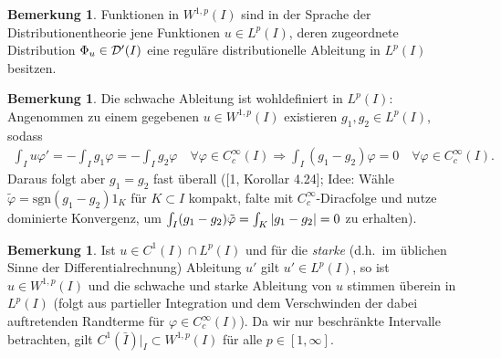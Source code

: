 \documentclass[twoside]{article}
\theoremstyle{definition}
\newtheorem{remark}[theorem]{Bemerkung}
\begin{document}
\begin{remark}
Funktionen in $W^{1,p}(I)$ sind in der Sprache der Distributionentheorie jene Funktionen $u \in L^p(I)$, deren zugeordnete Distribution $\Phi_u \in {\cal D}'(I)$ eine reguläre distributionelle Ableitung in $L^p(I)$ besitzen.
\end{remark}
\begin{remark}
Die schwache Ableitung ist wohldefiniert in $L^p(I)$: Angenommen zu einem gegebenen $u \in W^{1,p}(I)$ existieren $g_1,g_2 \in L^p(I)$, sodass
\begin{align*}
\int_I u \varphi' = - \int_I g_1 \varphi = - \int_I g_2 \varphi \quad \forall \varphi \in C_c^\infty(I) \Rightarrow \int_I (g_1 - g_2) \varphi = 0 \quad \forall \varphi \in C_c^\infty(I).
\end{align*}
Daraus folgt aber $g_1 = g_2$ fast überall ([1, Korollar 4.24]; Idee: Wähle $\tilde{\varphi} = \text{sgn}(g_1-g_2)1_K$ für $K \subset I$ kompakt, falte mit $C_c^\infty$-Diracfolge und nutze dominierte Konvergenz, um $\int_I (g_1-g_2) \tilde{\varphi} = \int_K \abs{g_1-g_2} = 0$ zu erhalten).
\end{remark}
\begin{remark} \label{bem:klas}
Ist $u \in C^1(I) \cap L^p(I)$ und für die \textit{starke} (d.h.\ im üblichen Sinne der Differentialrechnung) Ableitung $u'$ gilt $u' \in L^p(I)$, so ist $u \in W^{1,p}(I)$ und die schwache und starke Ableitung von $u$ stimmen überein in $L^p(I)$ (folgt aus partieller Integration und dem Verschwinden der dabei auftretenden Randterme für $\varphi \in C_c^\infty(I)$). Da wir nur beschränkte Intervalle betrachten, gilt $C^1(\bar{I})|_I \subset W^{1,p}(I)$ für alle $p \in [1,\infty]$.
\end{remark}
\end{document}
